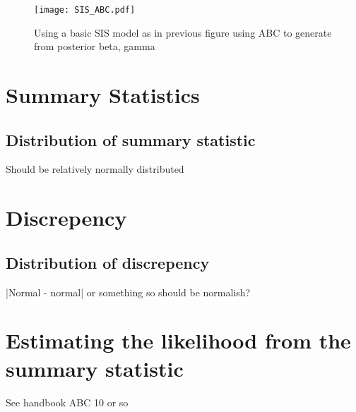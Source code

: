 \begin{figure}[htbp]
    \centering
    \texttt{[image: SIS\_ABC.pdf]}
    \caption{Using a basic SIS model as in previous figure using ABC to generate from posterior beta, gamma}
    \label{fig:ABC_R}
\end{figure}

\section{Summary Statistics}

\subsection*{Distribution of summary statistic}

Should be relatively normally distributed

\section{Discrepency}

\subsection*{Distribution of discrepency}

|Normal - normal| or something so should be normalish?

\section{Estimating the likelihood from the summary statistic}

See handbook ABC 10 or so